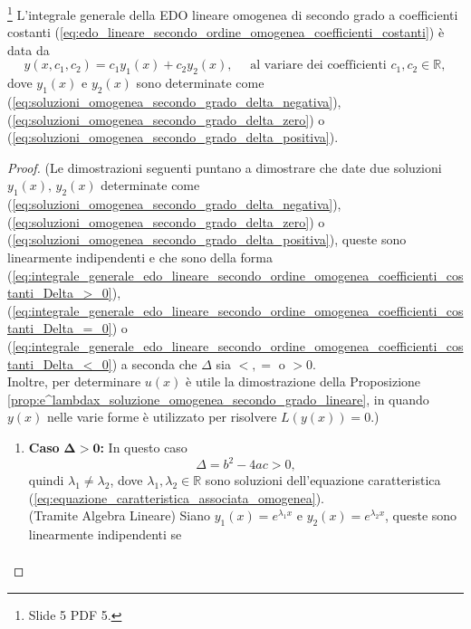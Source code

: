 \begin{theorem}\footnote{Slide 5 PDF 5.}
	L'integrale generale della EDO lineare omogenea di secondo grado a coefficienti costanti (\ref{eq:edo_lineare_secondo_ordine_omogenea_coefficienti_costanti}) è data da
	\begin{equation}\label{eq:integrale_generale_edo_lineare_secondo_ordine_omogenea_coefficienti_costanti}
		y(x,c_1,c_2) = c_1y_1(x) + c_2y_2(x),\quad \text{ al variare dei coefficienti } c_1,c_2\in\mathbb{R},
	\end{equation}
	dove $y_1(x)$ e $y_2(x)$ sono determinate come (\ref{eq:soluzioni_omogenea_secondo_grado_delta_negativa}), (\ref{eq:soluzioni_omogenea_secondo_grado_delta_zero}) o  (\ref{eq:soluzioni_omogenea_secondo_grado_delta_positiva}).
\end{theorem}
\begin{proof}
	(Le dimostrazioni seguenti puntano a dimostrare che date due soluzioni $y_1(x),\, y_2(x)$ determinate come (\ref{eq:soluzioni_omogenea_secondo_grado_delta_negativa}), (\ref{eq:soluzioni_omogenea_secondo_grado_delta_zero}) o  (\ref{eq:soluzioni_omogenea_secondo_grado_delta_positiva}), queste sono linearmente indipendenti e che sono della forma (\ref{eq:integrale_generale_edo_lineare_secondo_ordine_omogenea_coefficienti_costanti_Delta_>_0}), (\ref{eq:integrale_generale_edo_lineare_secondo_ordine_omogenea_coefficienti_costanti_Delta_=_0}) o (\ref{eq:integrale_generale_edo_lineare_secondo_ordine_omogenea_coefficienti_costanti_Delta_<_0}) a seconda che $\Delta$ sia $<,=$ o $>0$.\\
	Inoltre, per determinare $u(x)$ è utile la dimostrazione della Proposizione \ref{prop:e^lambdax_soluzione_omogenea_secondo_grado_lineare}, in quando $y(x)$ nelle varie forme è utilizzato per risolvere $L(y(x))=0$.)
	\begin{enumerate}
		\item \textbf{Caso} $\boldsymbol{\Delta>0}$\textbf{:} In questo caso
		\begin{equation*}
			\Delta = b^2-4ac>0,
		\end{equation*}
		quindi $\lambda_1\neq \lambda_2$, dove $\lambda_1,\lambda_2\in\mathbb{R}$ sono soluzioni dell'equazione caratteristica (\ref{eq:equazione_caratteristica_associata_omogenea}).\\
		\footnotemark (Tramite Algebra Lineare) Siano $y_1(x) = e^{\lambda_1 x}$ e $y_2(x) = e^{\lambda_2 x}$, queste sono linearmente indipendenti se
		\begin{equation*}
			\begin{matrix}

\end{matrix}
\end{equation*}
\end{enumerate}
\end{proof}
